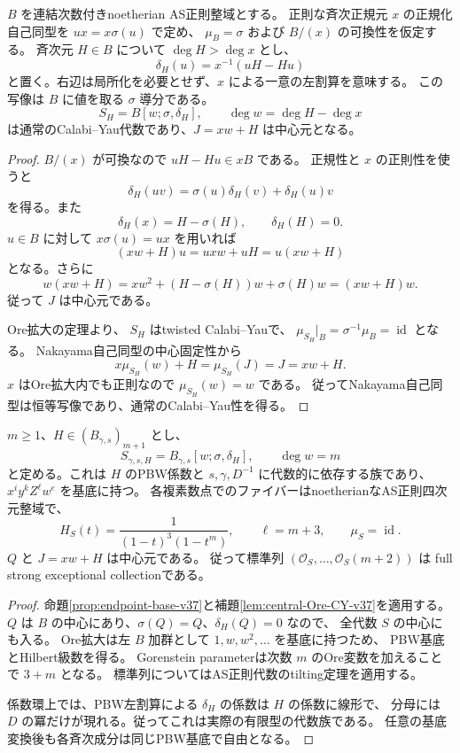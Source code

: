 \begin{lemma}[中心元を持つOre拡大]
\label{lem:central-Ore-CY-v37}
$B$ を連結次数付きnoetherian AS正則整域とする。
正則な斉次正規元 $x$ の正規化自己同型を
$ux=x\sigma(u)$ で定め、
$\mu_B=\sigma$ および $B/(x)$ の可換性を仮定する。
斉次元 $H\in B$ について $\deg H>\deg x$ とし、
\[
 \delta_H(u)=x^{-1}(uH-Hu)
\]
と置く。右辺は局所化を必要とせず、$x$ による一意の左割算を意味する。
この写像は $B$ に値を取る $\sigma$ 導分である。
\[
 S_H=B[w;\sigma,\delta_H],\qquad
 \deg w=\deg H-\deg x
\]
は通常のCalabi--Yau代数であり、$J=xw+H$ は中心元となる。
\end{lemma}

\begin{proof}
$B/(x)$ が可換なので $uH-Hu\in xB$ である。
正規性と $x$ の正則性を使うと
\[
 \delta_H(uv)=\sigma(u)\delta_H(v)+\delta_H(u)v
\]
を得る。また
\[
 \delta_H(x)=H-\sigma(H),\qquad\delta_H(H)=0.
\]
$u\in B$ に対して $x\sigma(u)=ux$ を用いれば
\[
 (xw+H)u=uxw+uH=u(xw+H)
\]
となる。さらに
\[
 w(xw+H)=xw^2+(H-\sigma(H))w+\sigma(H)w=(xw+H)w.
\]
従って $J$ は中心元である。

Ore拡大の定理\cite[Theorem~3.3]{LWWEndpoint37}より、
$S_H$ はtwisted Calabi--Yauで、
$\mu_{S_H}|_B=\sigma^{-1}\mu_B=\operatorname{id}$ となる。
Nakayama自己同型の中心固定性から
\[
 x\mu_{S_H}(w)+H=\mu_{S_H}(J)=J=xw+H.
\]
$x$ はOre拡大内でも正則なので $\mu_{S_H}(w)=w$ である。
従ってNakayama自己同型は恒等写像であり、通常のCalabi--Yau性を得る。
\end{proof}

\begin{theorem}[任意の混合項の代数的量子化]
\label{thm:endpoint-Ore-family-v37}
$m\ge1$、$H\in(B_{\gamma,s})_{m+1}$ とし、
\begin{equation}
\label{eq:endpoint-S-family-v37}
 S_{\gamma,s,H}
 =B_{\gamma,s}[w;\sigma,\delta_H],\qquad \deg w=m
\end{equation}
と定める。これは $H$ のPBW係数と $s,\gamma,D^{-1}$ に代数的に依存する族であり、
$x^i y^k Z^\ell w^e$ を基底に持つ。
各複素数点でのファイバーはnoetherianなAS正則四次元整域で、
\[
 H_S(t)=\frac1{(1-t)^3(1-t^m)},\qquad \ell=m+3,\qquad \mu_S=\operatorname{id}.
\]
$Q$ と $J=xw+H$ は中心元である。
従って標準列 $(\mathcal O_S,\ldots,\mathcal O_S(m+2))$ は
full strong exceptional collectionである。
\end{theorem}

\begin{proof}
命題\ref{prop:endpoint-base-v37}と補題\ref{lem:central-Ore-CY-v37}を適用する。
$Q$ は $B$ の中心にあり、$\sigma(Q)=Q$、$\delta_H(Q)=0$ なので、
全代数 $S$ の中心にも入る。
Ore拡大は左 $B$ 加群として $1,w,w^2,\ldots$ を基底に持つため、
PBW基底とHilbert級数を得る。
Gorenstein parameterは次数 $m$ のOre変数を加えることで $3+m$ となる。
標準列についてはAS正則代数のtilting定理\cite{MinamotoMori2011}を適用する。

係数環上では、PBW左割算による $\delta_H$ の係数は $H$ の係数に線形で、
分母には $D$ の冪だけが現れる。従ってこれは実際の有限型の代数族である。
任意の基底変換後も各斉次成分は同じPBW基底で自由となる。
\end{proof}

